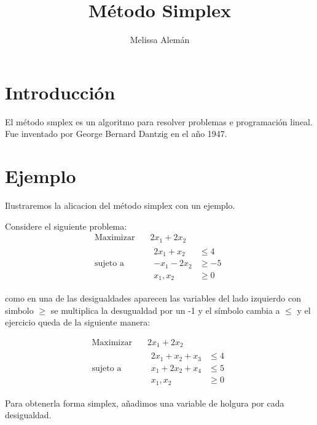 \documentclass{article}
\title{Método Simplex}
\author{Melissa Alemán}
\begin{document}
\maketitle

\section{Introducción}
\label{sec:introduccion}


El método smplex es un algoritmo para resolver problemas e
programación lineal. Fue inventado por George Bernard Dantzig en el
año 1947.

\section{Ejemplo}
\label{sec:ejemplo}

Ilustraremos la alicacion del método simplex con un ejemplo.

Considere el siguiente problema:
\begin{equation*}
 \begin{aligned}
\text{Maximizar} \quad & 2x_1+2x_2\\
\text{sujeto a} \quad &
  \begin{aligned}
    2x_1 + x_2 &\leq 4\\
    -x_1 - 2x_2 &\geq -5\\
     x_1,x_2 &\geq  0
  \end{aligned}
\end{aligned}
\end{equation*}

como en una de las desigualdades aparecen las variables del lado
izquierdo con simbolo $\geq$ se multiplica la desugualdad por un -1 y
el símbolo cambia a $\leq$ y el ejercicio queda de la siguiente
manera:

\begin{equation*}
 \begin{aligned}
\text{Maximizar} \quad & 2x_1+2x_2\\
\text{sujeto a} \quad &
  \begin{aligned}
    2x_1 + x_2 + x_3 &\leq 4\\
    x_1 + 2x_2 + x_4 &\leq 5\\
     x_1,x_2 &\geq  0
  \end{aligned}
\end{aligned}
\end{equation*}

Para obtenerla forma simplex, añadimos una variable de holgura por
cada desigualdad.
\end{document}
